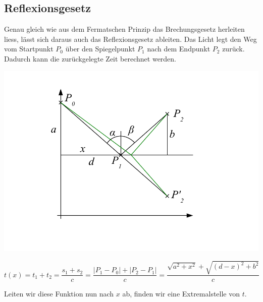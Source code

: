 

\subsection{Reflexionsgesetz}
\cite{Wikipedia}Genau gleich wie aus dem Fermatschen Prinzip das Brechungsgesetz herleiten liess, 
lässt sich daraus auch das Reflexionsgesetz ableiten.
Das Licht legt den Weg vom Startpunkt $P_0$ über den Spiegelpunkt $P_1$ 
nach dem Endpunkt $P_2$ zurück. Dadurch kann die zurückgelegte Zeit berechnet werden.

\includegraphics{./picture/Spiegelung.pdf}


\[
t(x) =
t_1 + t_2 =
\frac{s_1 + s_2}{c} =
\frac{|P_1 - P_0| + |P_2 - P_1|}{c} =
\frac{\sqrt{a^2 + x^2} + \sqrt{(d-x)^2 + b^2}}{c}
\]

Leiten wir diese Funktion nun nach $x$ ab, finden wir eine Extremalstelle von $t$.

